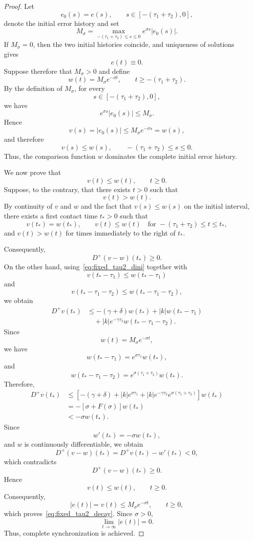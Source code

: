\documentclass[11pt]{article}
\theoremstyle{remark}
\begin{document}
{\begin{proof}
Let
\[
e_0(s)=e(s),
\qquad
s\in[-(\tau_1+\tau_2),0],
\]
denote the initial error history and set
\[
M_\sigma
=
\max_{-(\tau_1+\tau_2)\leq s\leq0}
e^{\sigma s}|e_0(s)|.
\]
If $M_\sigma=0$, then the two initial histories coincide, and uniqueness of solutions gives
\[
e(t)\equiv0.
\]
Suppose therefore that $M_\sigma>0$ and define
\[
w(t)=M_\sigma e^{-\sigma t},
\qquad
t\geq-(\tau_1+\tau_2).
\]
By the definition of $M_\sigma$, for every
\[
s\in[-(\tau_1+\tau_2),0],
\]
we have
\[
e^{\sigma s}|e_0(s)|
\leq M_\sigma.
\]
Hence
\[
v(s)=|e_0(s)|
\leq
M_\sigma e^{-\sigma s}
=
w(s),
\]
and therefore
\[
v(s)\leq w(s),
\qquad
-(\tau_1+\tau_2)\leq s\leq0.
\]
Thus, the comparison function $w$ dominates the complete initial error history.

We now prove that
\[
v(t)\leq w(t),
\qquad t\geq0.
\]
Suppose, to the contrary, that there exists $t>0$ such that
\[
v(t)>w(t).
\]
By continuity of $v$ and $w$ and the fact that $v(s)\leq w(s)$ on the initial interval, there exists a first contact time $t_*>0$ such that
\[
v(t_*)=w(t_*),
\qquad
v(t)\leq w(t)
\quad
\text{for }
-(\tau_1+\tau_2)\leq t\leq t_*,
\]
and $v(t)>w(t)$ for times immediately to the right of $t_*$.

Consequently,
\[
D^+(v-w)(t_*)\geq0.
\]
On the other hand, using~\eqref{eq:fixed_tau2_dini} together with
\[
v(t_*-\tau_1)\leq w(t_*-\tau_1)
\]
and
\[
v(t_*-\tau_1-\tau_2)
\leq
w(t_*-\tau_1-\tau_2),
\]
we obtain
\begin{align*}
D^+v(t_*)
&\leq
-(\gamma+\delta)w(t_*)
+|k|w(t_*-\tau_1)\\
&\quad
+|k|e^{-\gamma\tau_2}
w(t_*-\tau_1-\tau_2).
\end{align*}
Since
\[
w(t)=M_\sigma e^{-\sigma t},
\]
we have
\[
w(t_*-\tau_1)
=
e^{\sigma\tau_1}w(t_*),
\]
and
\[
w(t_*-\tau_1-\tau_2)
=
e^{\sigma(\tau_1+\tau_2)}w(t_*).
\]
Therefore,
\begin{align*}
D^+v(t_*)
&\leq
\left[
-(\gamma+\delta)
+|k|e^{\sigma\tau_1}
+|k|e^{-\gamma\tau_2}
e^{\sigma(\tau_1+\tau_2)}
\right]w(t_*)\\
&=
-\left[\sigma+F(\sigma)\right]w(t_*)\\
&<
-\sigma w(t_*).
\end{align*}
Since
\[
w'(t_*)=-\sigma w(t_*),
\]
and $w$ is continuously differentiable, we obtain
\[
D^+(v-w)(t_*)
=
D^+v(t_*)-w'(t_*)
<0,
\]
which contradicts
\[
D^+(v-w)(t_*)\geq0.
\]
Hence
\[
v(t)\leq w(t),
\qquad t\geq0.
\]
Consequently,
\[
|e(t)|
=
v(t)
\leq
M_\sigma e^{-\sigma t},
\qquad t\geq0,
\]
which proves~\eqref{eq:fixed_tau2_decay}. Since $\sigma>0$,
\[
\lim_{t\to\infty}|e(t)|=0.
\]
Thus, complete synchronization is achieved.
\end{proof}



}
\end{document}
